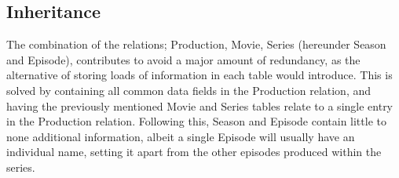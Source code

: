 \subsection{Inheritance}
The combination of the relations; Production, Movie, Series (hereunder Season and Episode), contributes to avoid a major amount of redundancy, as the alternative of storing loads of information in each table would introduce. This is solved by containing all common data fields in the Production relation, and having the previously mentioned Movie and Series tables relate to a single entry in the Production relation. Following this, Season and Episode contain little to none additional information, albeit a single Episode will usually have an individual name, setting it apart from the other episodes produced within the series.

